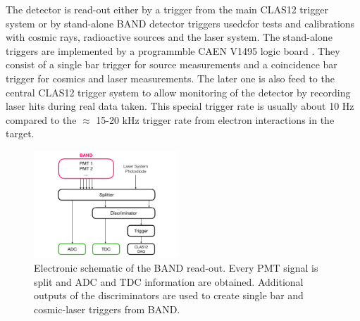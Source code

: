 \documentclass[3p,final,twocolumn]{elsarticle}
\begin{document}
The detector is read-out either by a trigger from the main CLAS12 trigger system \cite{clas12-trigger} or by stand-alone BAND detector triggers usedcfor tests and calibrations with cosmic rays, radioactive sources and the laser system. The stand-alone triggers are implemented by a programmble CAEN V1495 logic board \cite{caen-logicboard}. They consist of a single bar trigger for source measurements and a coincidence bar trigger for cosmics and laser measurements. The later one is also feed to the central CLAS12 trigger system to allow monitoring of the detector by recording laser hits during real data taken. This special trigger rate is usually about 10 \si{\hertz} compared to the $\approx$ 15-20 \si{\kilo\hertz} trigger rate from electron interactions in the target.

\begin{figure}[tb]
	\centering
	\includegraphics[width=0.48\textwidth]{electronics-diag.pdf}
	\caption{Electronic schematic of the BAND read-out. Every PMT signal is split and ADC and TDC information are obtained. Additional outputs of the discriminators are used to create single bar and cosmic-laser triggers from BAND.}
	\label{fig:electronic-diag}
\end{figure}


\end{document}
